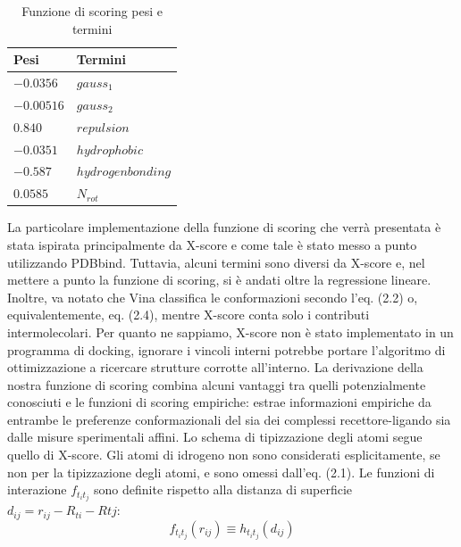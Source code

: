\begin{table}[H]
    \centering
    \begin{tabular}{|l|l|}
        \hline
        \textbf{Pesi} & \textbf{Termini}\\
        \hline
        $-0.0356$ & $gauss_1$\\
        $-0.00516$ & $gauss_2$\\
        $0.840$ & $repulsion$\\
        $-0.0351$ & $hydrophobic$\\
        $-0.587$ & $hydrogen bonding$\\
        $0.0585$ & $N_{rot}$\\
        \hline
    \end{tabular}
    \caption{Funzione di scoring pesi e termini}
    \label{tab:Tabella Pesi e Termini}
\end{table}
\noindent La particolare implementazione della funzione di scoring che verrà presentata è stata ispirata principalmente da X-score e come tale è stato messo a punto utilizzando PDBbind. Tuttavia, alcuni termini sono diversi da X-score e, nel mettere a punto la funzione di scoring, si è andati oltre la regressione lineare. Inoltre, va notato che Vina classifica le conformazioni secondo l'eq. (2.2) o, equivalentemente, eq. (2.4), mentre X-score conta solo i contributi intermolecolari.
Per quanto ne sappiamo, X-score non è stato implementato in un programma di docking, ignorare i vincoli interni potrebbe portare l'algoritmo di ottimizzazione a ricercare strutture corrotte all'interno.\newline
La derivazione della nostra funzione di scoring combina alcuni vantaggi tra quelli potenzialmente conosciuti e le funzioni di scoring empiriche: estrae informazioni empiriche da entrambe le preferenze conformazionali del sia dei complessi recettore-ligando sia dalle misure sperimentali affini.\newline 
Lo schema di tipizzazione degli atomi segue quello di X-score. Gli atomi di idrogeno non sono considerati esplicitamente, se non per la tipizzazione degli atomi, e sono omessi dall'eq. (2.1).\newline
Le funzioni di interazione $f_{t_it_j}$ sono definite rispetto alla distanza di superficie  $d_{ij} = r_{ij} - R_{ti}
- Rtj$:\newline
\begin{equation}
    f_{t_it_j}(r_{ij}) \equiv h_{t_it_j}(d_{ij})
\end{equation}\newline
